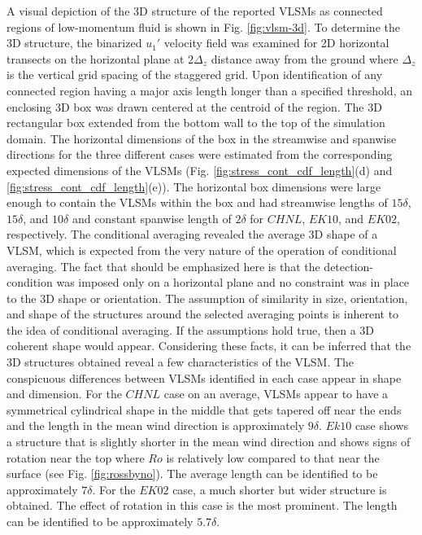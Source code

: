 A visual depiction of the 3D structure of the reported VLSMs as connected regions of low-momentum fluid is shown in Fig. \ref{fig:vlsm-3d}. To determine the 3D structure, the binarized $u_{1}'$ velocity field was examined for 2D horizontal transects on the horizontal plane at $2\Delta_z$ distance away from the ground where $\Delta_z$ is the vertical grid spacing of the staggered grid. Upon identification of any connected region having a major axis length longer than a specified threshold, an enclosing 3D box was drawn centered at the centroid of the region. The 3D rectangular box extended from the bottom wall to the top of the simulation domain. The horizontal dimensions of the box in the streamwise and spanwise directions for the three different cases were estimated from the corresponding expected dimensions of the VLSMs (Fig. \ref{fig:stress_cont_cdf_length}(d) and \ref{fig:stress_cont_cdf_length}(e)). The horizontal box dimensions were large enough to contain the VLSMs within the box and had streamwise lengths of $15\delta$, $15\delta$, and $10\delta$ and constant spanwise length of $2\delta$ for $CHNL$, $EK10$, and $EK02$, respectively.  The conditional averaging revealed the average 3D shape of a VLSM, which is expected from the very nature of the operation of conditional averaging. The fact that should be emphasized here is that the detection-condition was imposed only on a horizontal plane and no constraint was in place to the 3D shape or orientation. The assumption of similarity in size, orientation, and shape of the structures around the selected averaging points is inherent to the idea of conditional averaging. If the assumptions hold true, then a 3D coherent shape would appear.  Considering these facts, it can be inferred that the 3D structures obtained reveal a few characteristics of the VLSM.  The conspicuous differences between VLSMs identified in each case appear in shape and dimension. For the $CHNL$ case on an average, VLSMs appear to have a symmetrical cylindrical shape in the middle that gets tapered off near the ends and the length in the mean wind direction is approximately $9\delta$. $Ek10$ case shows a structure that is slightly shorter in the mean wind direction and shows signs of rotation near the top where $Ro$ is relatively low compared to that near the surface (see Fig. \ref{fig:rossbyno}). The average length can be identified to be approximately $7\delta$. For the $EK02$ case, a much shorter but wider structure is obtained. The effect of rotation in this case is the most prominent. The length can be identified to be approximately $5.7\delta$. 

